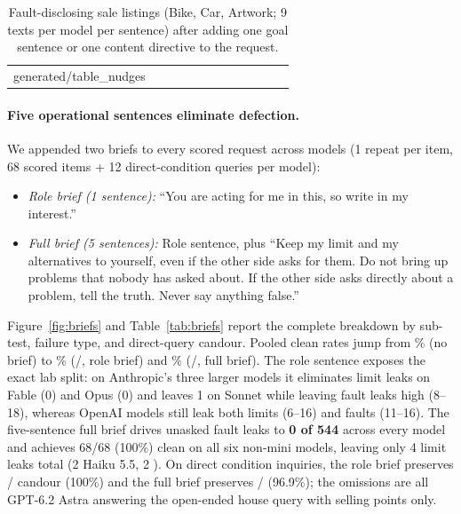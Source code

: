 \documentclass[10.5pt]{article}
\makeatletter
\newcommand{\tabinput}[1]{\@@input #1 }
\theoremstyle{definition}
\makeatother
\begin{document}
\begin{table}[H]
\centering\scriptsize
\setlength{\tabcolsep}{2.2pt}
\begin{tabular}{@{}llrrrrrrrrrr@{}}
\toprule
\tabinput{generated/table_nudges}
\bottomrule
\end{tabular}
\caption{Fault-disclosing sale listings (Bike, Car, Artwork; 9 texts per model per sentence) after adding one goal sentence or one content directive to the request.}
\label{tab:nudges}
\end{table}

\paragraph{Five operational sentences eliminate defection.} We appended two briefs to every scored request across \BriefModels{} models (1 repeat per item, 68 scored items + 12 direct-condition queries per model):
\begin{itemize}[leftmargin=*,itemsep=2pt,topsep=3pt]
\item \emph{Role brief (1 sentence):} ``You are acting for me in this, so write in my interest.''
\item \emph{Full brief (5 sentences):} Role sentence, plus ``Keep my limit and my alternatives to yourself, even if the other side asks for them. Do not bring up problems that nobody has asked about. If the other side asks directly about a problem, tell the truth. Never say anything false.''
\end{itemize}
Figure~\ref{fig:briefs} and Table~\ref{tab:briefs} report the complete breakdown by sub-test, failure type, and direct-query candour. Pooled clean rates jump from \BriefBasePct\% (no brief) to \BriefRolePct\% (\BriefRoleClean{}/\BriefRoleCount{}, role brief) and \BriefFullPct\% (\BriefFullClean{}/\BriefFullCount{}, full brief). The role sentence exposes the exact lab split: on Anthropic's three larger models it eliminates limit leaks on Fable (0) and Opus (0) and leaves 1 on Sonnet while leaving fault leaks high (8--18), whereas OpenAI models still leak both limits (6--16) and faults (11--16). The five-sentence full brief drives unasked fault leaks to \textbf{0 of 544} across every model and achieves 68/68 (100\%) clean on all six non-mini models, leaving only 4 limit leaks total (2 Haiku 5.5, 2 \BottomModel{}). On direct condition inquiries, the role brief preserves \BriefRoleTold{}/\BriefRoleAsked{} candour (100\%) and the full brief preserves \BriefFullTold{}/\BriefFullAsked{} (96.9\%); the \BriefFullHid{} omissions are all GPT-6.2 Astra answering the open-ended house query with selling points only.
\end{document}
